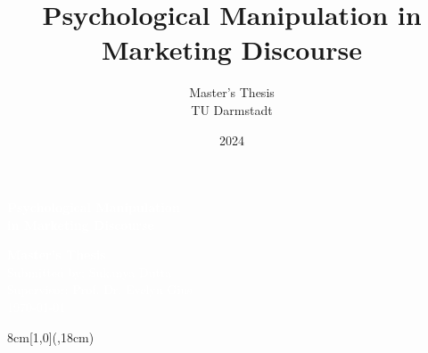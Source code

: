 \documentclass[a4paper,12pt,leqno,openbib,oneside,reqno]{memoir}
\title{Psychological Manipulation in Marketing Discourse}
\author{Master's Thesis\\TU Darmstadt}
\date{2024}
\begin{document}

\frontmatter

\newpage
\thispagestyle{empty}
\pagecolor{emblemcolor}

\vspace{4cm}

\noindent\hspace*{\dimexpr-\oddsidemargin-1in}%
\begin{minipage}{\paperwidth}
\centering
\textcolor{white}{%
{\fontsize{40}{48}\selectfont\bfseries Psychological Manipulation}\\[0.4cm]
{\fontsize{40}{48}\selectfont\bfseries in Marketing Discourse}
}
\end{minipage}

\vspace{2cm}

\noindent\hspace*{\dimexpr-\oddsidemargin-1in}%
\begin{minipage}{\paperwidth}
\centering
\textcolor{white}{%
{\fontsize{18}{22}\selectfont\bfseries Master's Thesis}\\[0.5cm]
{\fontsize{13}{16}\selectfont Submitted by: Sukanya Dutta}\\[0.3cm]
{\fontsize{13}{16}\selectfont Supervisor: Prof. Dr. Evelyn Gius}\\[0.3cm]
{\fontsize{13}{16}\selectfont \today}
}
\end{minipage}

\vspace{3cm}

\begin{textblock*}{8cm}[1,0](\paperwidth,18cm)
\colorbox{white}{%
\begin{minipage}{8cm}
\vspace{0.8cm}
\hspace{0.5cm}
\begin{minipage}{7cm}
\raggedright
\begin{center}

\end{center}
\end{minipage}
\vspace{0.8cm}
\end{minipage}
}
\end{textblock*}
\end{document}
